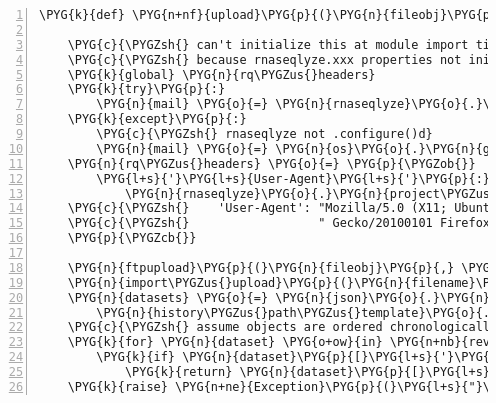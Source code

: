 \begin{Verbatim}[commandchars=\\\{\},numbers=left,firstnumber=1,stepnumber=5]
\PYG{k}{def} \PYG{n+nf}{upload}\PYG{p}{(}\PYG{n}{fileobj}\PYG{p}{,} \PYG{n}{filename}\PYG{p}{)}\PYG{p}{:}

    \PYG{c}{\PYGZsh{} can't initialize this at module import time}
    \PYG{c}{\PYGZsh{} because rnaseqlyze.xxx properties not initialized}
    \PYG{k}{global} \PYG{n}{rq\PYGZus{}headers}
    \PYG{k}{try}\PYG{p}{:}
        \PYG{n}{mail} \PYG{o}{=} \PYG{n}{rnaseqlyze}\PYG{o}{.}\PYG{n}{admin\PYGZus{}email}
    \PYG{k}{except}\PYG{p}{:}
        \PYG{c}{\PYGZsh{} rnaseqlyze not .configure()d}
        \PYG{n}{mail} \PYG{o}{=} \PYG{n}{os}\PYG{o}{.}\PYG{n}{getenv}\PYG{p}{(}\PYG{l+s}{"}\PYG{l+s}{USER}\PYG{l+s}{"}\PYG{p}{)} \PYG{o}{+} \PYG{l+s}{"}\PYG{l+s}{@}\PYG{l+s}{"} \PYG{o}{+} \PYG{n}{os}\PYG{o}{.}\PYG{n}{uname}\PYG{p}{(}\PYG{p}{)}\PYG{p}{[}\PYG{l+m+mi}{1}\PYG{p}{]}
    \PYG{n}{rq\PYGZus{}headers} \PYG{o}{=} \PYG{p}{\PYGZob{}}
        \PYG{l+s}{'}\PYG{l+s}{User-Agent}\PYG{l+s}{'}\PYG{p}{:} \PYG{l+s}{"}\PYG{l+s+si}{\PYGZpc{}s}\PYG{l+s}{ (version:}\PYG{l+s+si}{\PYGZpc{}s}\PYG{l+s}{ / admin:}\PYG{l+s+si}{\PYGZpc{}s}\PYG{l+s}{)}\PYG{l+s}{"} \PYG{o}{\PYGZpc{}} \PYG{p}{(}
            \PYG{n}{rnaseqlyze}\PYG{o}{.}\PYG{n}{project\PYGZus{}name}\PYG{p}{,} \PYG{n}{rnaseqlyze}\PYG{o}{.}\PYG{n}{\PYGZus{}\PYGZus{}version\PYGZus{}\PYGZus{}}\PYG{p}{,} \PYG{n}{mail}\PYG{p}{)}\PYG{p}{,}
    \PYG{c}{\PYGZsh{}    'User-Agent': "Mozilla/5.0 (X11; Ubuntu; Linux x86\PYGZus{}64; rv:13.0)" \PYGZbs{}}
    \PYG{c}{\PYGZsh{}                  " Gecko/20100101 Firefox/13.0.1",}
    \PYG{p}{\PYGZcb{}}

    \PYG{n}{ftpupload}\PYG{p}{(}\PYG{n}{fileobj}\PYG{p}{,} \PYG{n}{filename}\PYG{p}{)}
    \PYG{n}{import\PYGZus{}upload}\PYG{p}{(}\PYG{n}{filename}\PYG{p}{)}
    \PYG{n}{datasets} \PYG{o}{=} \PYG{n}{json}\PYG{o}{.}\PYG{n}{loads}\PYG{p}{(}\PYG{n}{api\PYGZus{}call}\PYG{p}{(}
        \PYG{n}{history\PYGZus{}path\PYGZus{}template}\PYG{o}{.}\PYG{n}{format}\PYG{p}{(}\PYG{n}{history}\PYG{o}{=}\PYG{n}{default\PYGZus{}history}\PYG{p}{)}\PYG{p}{)}\PYG{p}{)}
    \PYG{c}{\PYGZsh{} assume objects are ordered chronologically...}
    \PYG{k}{for} \PYG{n}{dataset} \PYG{o+ow}{in} \PYG{n+nb}{reversed}\PYG{p}{(}\PYG{n}{datasets}\PYG{p}{)}\PYG{p}{:}
        \PYG{k}{if} \PYG{n}{dataset}\PYG{p}{[}\PYG{l+s}{'}\PYG{l+s}{name}\PYG{l+s}{'}\PYG{p}{]} \PYG{o}{==} \PYG{n}{filename}\PYG{p}{:}
            \PYG{k}{return} \PYG{n}{dataset}\PYG{p}{[}\PYG{l+s}{'}\PYG{l+s}{id}\PYG{l+s}{'}\PYG{p}{]}
    \PYG{k}{raise} \PYG{n+ne}{Exception}\PYG{p}{(}\PYG{l+s}{"}\PYG{l+s}{Couldn}\PYG{l+s}{'}\PYG{l+s}{t find id of uploaded file in dataset}\PYG{l+s}{"}\PYG{p}{)}
\end{Verbatim}


